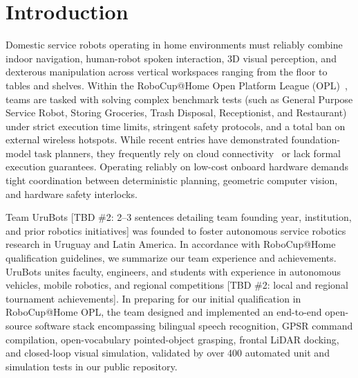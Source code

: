 \documentclass[runningheads,a4paper]{llncs}
\begin{document}
\section{Introduction}
\label{sec:intro}
Domestic service robots operating in home environments must reliably combine indoor navigation, human-robot spoken interaction, 3D visual perception, and dexterous manipulation across vertical workspaces ranging from the floor to tables and shelves. Within the RoboCup@Home Open Platform League (OPL)~\cite{robocup_rulebook_2026,robocup_cfp_2027}, teams are tasked with solving complex benchmark tests (such as General Purpose Service Robot, Storing Groceries, Trash Disposal, Receptionist, and Restaurant) under strict execution time limits, stringent safety protocols, and a total ban on external wireless hotspots. While recent entries have demonstrated foundation-model task planners, they frequently rely on cloud connectivity~\cite{memmesheimer2024nimbro} or lack formal execution guarantees. Operating reliably on low-cost onboard hardware demands tight coordination between deterministic planning, geometric computer vision, and hardware safety interlocks.

Team UruBots [TBD \#2: 2--3 sentences detailing team founding year, institution, and prior robotics initiatives] was founded to foster autonomous service robotics research in Uruguay and Latin America. In accordance with RoboCup@Home qualification guidelines, we summarize our team experience and achievements. UruBots unites faculty, engineers, and students with experience in autonomous vehicles, mobile robotics, and regional competitions [TBD \#2: local and regional tournament achievements]. In preparing for our initial qualification in RoboCup@Home OPL, the team designed and implemented an end-to-end open-source software stack encompassing bilingual speech recognition, GPSR command compilation, open-vocabulary pointed-object grasping, frontal LiDAR docking, and closed-loop visual simulation, validated by over 400 automated unit and simulation tests in our public repository.
\end{document}
